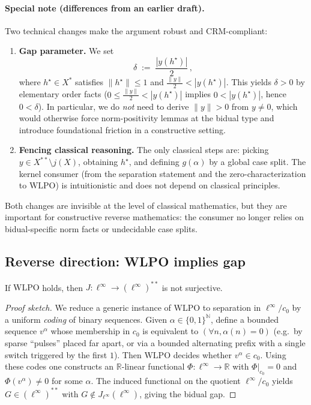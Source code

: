 \documentclass[11pt]{article}
\newcommand{\linf}{\ell^\infty}
\newcommand{\WLPO}{\mathrm{WLPO}}
\begin{document}
\paragraph{Special note (differences from an earlier draft).}
Two technical changes make the argument robust and CRM-compliant:
\begin{enumerate}
  \item \textbf{Gap parameter.} We set
  \[
    \delta \;:=\; \frac{|y(h^\star)|}{2}\,,
  \]
  where $h^\star\in X^\ast$ satisfies $\|h^\star\|\le 1$ and
  $\tfrac{\|y\|}{2}<|y(h^\star)|$. This yields $\delta>0$ by elementary
  order facts ($0\le \tfrac{\|y\|}{2} < |y(h^\star)|$ implies $0<|y(h^\star)|$,
  hence $0<\delta$). In particular, we do \emph{not} need to derive $\|y\|>0$
  from $y\neq 0$, which would otherwise force norm-positivity lemmas at the bidual
  type and introduce foundational friction in a constructive setting.
  \item \textbf{Fencing classical reasoning.} The only classical steps are:
  picking $y\in X^{**}\!\setminus j(X)$, obtaining $h^\star$, and
  defining $g(\alpha)$ by a global case split. The kernel consumer
  (from the separation statement and the zero-characterization to $\WLPO$)
  is intuitionistic and does not depend on classical principles.
\end{enumerate}
Both changes are invisible at the level of classical mathematics, but they are
important for constructive reverse mathematics: the consumer no longer relies on
bidual-specific norm facts or undecidable case splits.

\subsection{Reverse direction: WLPO implies gap}

\begin{thm}[$\WLPO$ implies Gap]
If $\WLPO$ holds, then $J:\linf\to(\linf)^{**}$ is not surjective.
\end{thm}

\begin{proof}[Proof sketch]
We reduce a generic instance of $\WLPO$ to separation in $\ell^\infty/c_0$ by a
uniform \emph{coding} of binary sequences. Given $\alpha\in\{0,1\}^{\mathbb N}$,
define a bounded sequence $v^\alpha$ whose membership in $c_0$ is equivalent to
$(\forall n,\alpha(n)=0)$ (e.g.\ by sparse ``pulses'' placed far apart, or via a
bounded alternating prefix with a single switch triggered by the first $1$).
Then $\WLPO$ decides whether $v^\alpha\in c_0$. Using these codes one constructs
an $\mathbb R$-linear functional $\Phi:\ell^\infty\to\mathbb R$ with $\Phi|_{c_0}=0$
and $\Phi(v^\alpha)\neq 0$ for some $\alpha$. The induced functional on the
quotient $\ell^\infty/c_0$ yields $G\in(\ell^\infty)^{**}$ with
$G\not\in J_{\ell^\infty}(\ell^\infty)$, giving the bidual gap.
\end{proof}
\end{document}
